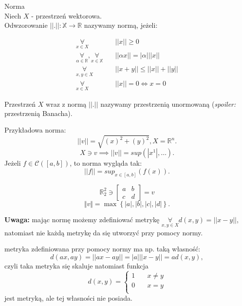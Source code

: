 \documentclass[../main.tex]{subfiles}
\begin{document}
\begin{definicja}
Norma\\
    Niech $X$ - przestrzeń wektorowa.\\
Odwzorowanie $||.||: \mathbb{X}\to \mathbb{R}$ nazywamy normą, jeżeli:

\begin{align}
    \underset{x\in X}{\forall} \quad &||x|| \geq 0\\
    \underset{\alpha\in\mathbb{R}}{\forall}, \underset{x\in \mathbb{X}}{\forall} \quad &|| \alpha x|| = |\alpha| ||x||\\
    \underset{x,y \in X}{\forall} \quad &||x+y|| \leq ||x|| + ||y||\\
    \underset{x\in X}{\forall} \quad &||x|| = 0 \iff x = 0
\end{align}

Przestrzeń $X$ wraz z normą $||.||$ nazywamy przestrzenią unormowaną (\textit{spoiler:} przestrzenią Banacha).
\end{definicja}

\begin{przyklad}
    Przykładowa norma:\\
    \[
        ||v|| = \sqrt{(x)^2 + (y)^2}, X = \mathbb{R}^{n}
    .\]
    \[
        X \ni v \implies||v|| = sup(|x^1|,\dots).
    \]
    Jeżeli $f\in \mathcal{C}([a,b])$,
    to norma wygląda tak:
    \[
        ||f|| = sup_{x\in{[a,b]}} (f(x))
    .\]
\end{przyklad}
\begin{przyklad}
    \[
        \mathbb{R}^2_2 \ni \begin{bmatrix} a&b\\c&d \end{bmatrix} = v
    \]
    \[
        \Vert v \Vert = \max \left\{ |a|, |b|, |c|, |d| \right\}
    .\]
\end{przyklad}

    \textbf{Uwaga:} mając normę możemy zdefiniować metrykę $\underset{x,y\in X}{\forall} d(x,y) = ||x-y||$, natomiast nie każdą metrykę da się utworzyć przy pomocy normy.

\begin{przyklad}
    metryka zdefiniowana przy pomocy normy ma np. taką własność:
    \[
        d(ax,ay) = ||ax - ay|| = |a| ||x-y|| = a d(x,y),
    \]
    czyli taka metryka się skaluje natomiast funkcja
    \[ d(x,y) =
    \begin{cases}
        1 & \quad x\neq y\\
        0 & \quad x=y\\
    \end{cases}
    \]
    jest metryką, ale tej własności nie posiada.
\end{przyklad}
\end{document}

